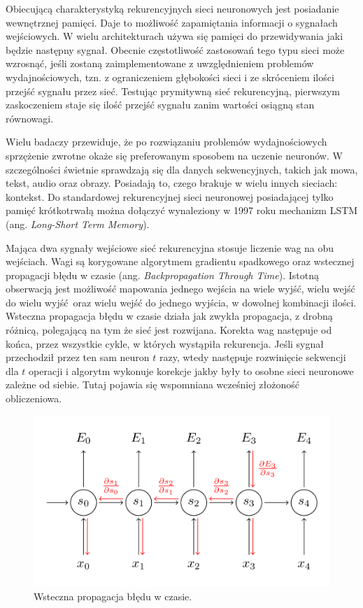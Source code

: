 \documentclass[12pt,a4paper,twoside,titlepage,openright]{book}
\begin{document}
\begin{itemize}
\begin{itemize}
Obiecującą charakterystyką rekurencyjnych sieci neuronowych jest posiadanie wewnętrznej pamięci. Daje to możliwość zapamiętania informacji o sygnałach wejściowych. W wielu architekturach używa się pamięci do przewidywania jaki będzie następny sygnał. Obecnie częstotliwość zastosowań tego typu sieci może wzrosnąć, jeśli zostaną zaimplementowane z uwzględnieniem problemów wydajnościowych, tzn. z ograniczeniem głębokości sieci i ze skróceniem ilości przejść sygnału przez sieć. Testując prymitywną sieć rekurencyjną, pierwszym zaskoczeniem staje się ilość przejść sygnału zanim wartości osiągną stan równowagi.

Wielu badaczy \cite{siteRNN} przewiduje,  że po rozwiązaniu problemów wydajnościowych sprzężenie zwrotne okaże się preferowanym sposobem na uczenie neuronów. W szczególności świetnie sprawdzają się dla danych sekwencyjnych, takich jak mowa, tekst, audio oraz obrazy. Posiadają to, czego brakuje w wielu innych sieciach: kontekst. Do standardowej rekurencyjnej sieci neuronowej posiadającej tylko pamięć krótkotrwałą można dołączyć wynaleziony w 1997 roku mechanizm LSTM (ang. \textit{Long-Short Term Memory}). 

Mająca dwa sygnały wejściowe sieć rekurencyjna stosuje liczenie wag na obu wejściach. Wagi są korygowane algorytmem gradientu spadkowego oraz wstecznej propagacji błędu w czasie (ang. \textit{Backpropagation Through Time}). Istotną obserwacją jest możliwość mapowania jednego wejścia na wiele wyjść, wielu wejść do wielu wyjść oraz wielu wejść do jednego wyjścia, w dowolnej kombinacji ilości. Wsteczna propagacja błędu w czasie działa jak zwykła propagacja, z drobną różnicą, polegającą na tym że sieć jest rozwijana. Korekta wag następuje od końca, przez wszystkie cykle, w których wystąpiła rekurencja. Jeśli sygnał przechodził przez ten sam neuron $t$ razy, wtedy następuje rozwinięcie sekwencji dla $t$ operacji i algorytm wykonuje korekcje jakby były to osobne sieci neuronowe zależne od siebie. Tutaj pojawia się wspomniana wcześniej złożoność obliczeniowa.

\begin{figure}[ht]
	\centering
			\includegraphics[resolution=100, scale=0.55]{backpropagationThroughTime.png}
		\caption{Wsteczna propagacja błędu w czasie.}
\end{figure}


\end{itemize}
\end{itemize}
\end{document}
